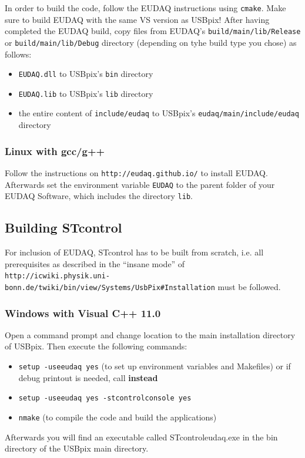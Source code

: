 \documentclass[a4paper,12pt]{article}
\begin{document}



In order to build the code, follow the EUDAQ instructions using {\tt cmake}.
Make sure to build EUDAQ with the same VS version as USBpix!
After having completed the EUDAQ build, copy files from EUDAQ's 
{\tt build/main/lib/Release} or {\tt build/main/lib/Debug} directory (depending 
on tyhe build type you chose) as follows:
\begin{itemize}
\item {\tt EUDAQ.dll} to USBpix's {\tt bin} directory
\item {\tt EUDAQ.lib} to USBpix's {\tt lib} directory
\item the entire content of {\tt include/eudaq} to 
    USBpix's {\tt eudaq/main/include/eudaq} directory
\end{itemize}

\subsubsection{Linux with gcc/g++}\label{sec:eudaq_linux}

Follow the instructions on {\tt http://eudaq.github.io/}
to install EUDAQ.
Afterwards set the environment variable {\tt EUDAQ} to the parent folder 
of your EUDAQ Software, which includes the directory {\tt lib}. 

\subsection{Building STcontrol}

For inclusion of EUDAQ, STcontrol has to be built from scratch, i.e.
all prerequisites as described in the ``insane mode'' of\\
{\tt http://icwiki.physik.uni-bonn.de/twiki/bin/view/Systems/UsbPix\#Installation}
must be followed.

\subsubsection{Windows with Visual C++ 11.0}

Open a command prompt and change location to the main installation
directory of USBpix. Then execute the following commands:
\begin{itemize}
\item {\tt setup -useeudaq yes}
 (to set up environment variables and Makefiles) or if debug printout is needed, call {\bf instead}
\item {\tt setup -useeudaq yes -stcontrol\textunderscore console yes}
\item {\tt nmake} (to compile the code and build the applications)
\end{itemize}
Afterwards you will find an executable called STcontrol\textunderscore eudaq.exe in the bin
directory of the USBpix main directory.
\end{document}
